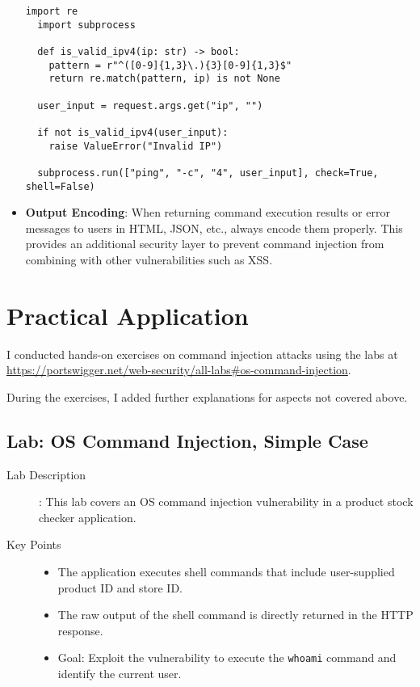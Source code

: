 \documentclass{article}
\begin{document}
\begin{itemize}
  \begin{lstlisting}[caption={Python: Using subprocess.run (shell=False) with Input Validation}]
  import re
  import subprocess

  def is_valid_ipv4(ip: str) -> bool:
    pattern = r"^([0-9]{1,3}\.){3}[0-9]{1,3}$"
    return re.match(pattern, ip) is not None

  user_input = request.args.get("ip", "")

  if not is_valid_ipv4(user_input):
    raise ValueError("Invalid IP")

  subprocess.run(["ping", "-c", "4", user_input], check=True, shell=False)
  \end{lstlisting}

  \item \textbf{Output Encoding}: When returning command execution results or error messages to users in HTML, JSON, etc., always encode them properly. This provides an additional security layer to prevent command injection from combining with other vulnerabilities such as XSS.
\end{itemize}

\section*{Practical Application}
I conducted hands-on exercises on command injection attacks using the labs at \url{https://portswigger.net/web-security/all-labs#os-command-injection}.

During the exercises, I added further explanations for aspects not covered above.

\subsection*{Lab: OS Command Injection, Simple Case}
\begin{description}
  \item[Lab Description]: This lab covers an OS command injection vulnerability in a product stock checker application.
  \item[Key Points]
  
    \begin{itemize}
      \item The application executes shell commands that include user-supplied product ID and store ID.
      \item The raw output of the shell command is directly returned in the HTTP response.
      \item Goal: Exploit the vulnerability to execute the \texttt{whoami} command and identify the current user.
    \end{itemize}
    
\end{description}
\end{document}
